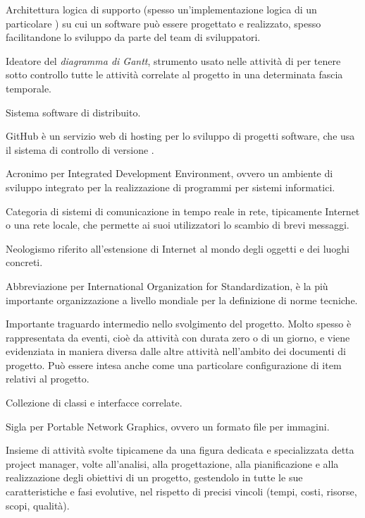 Architettura logica di supporto (spesso un'implementazione logica di un particolare ) su cui un software può essere progettato e realizzato, spesso facilitandone lo sviluppo da parte del team di sviluppatori.
\clearpage

Ideatore del \textit{diagramma di Gantt}, strumento usato nelle attività di  per tenere sotto controllo tutte le attività correlate al progetto in una determinata fascia temporale.

Sistema software di  distribuito.

GitHub è un servizio web di hosting per lo sviluppo di progetti software, che usa il sistema di controllo di versione .
\clearpage

Acronimo per Integrated Development Environment, ovvero un ambiente di sviluppo integrato per la realizzazione di programmi per sistemi informatici.

Categoria di sistemi di comunicazione in tempo reale in rete, tipicamente Internet o una rete locale, che permette ai suoi utilizzatori lo scambio di brevi messaggi.

Neologismo riferito all'estensione di Internet al mondo degli oggetti e dei luoghi concreti.

Abbreviazione per International Organization for Standardization, è la più importante organizzazione a livello mondiale per la definizione di norme tecniche.
\clearpage

Importante traguardo intermedio nello svolgimento del progetto. Molto spesso è rappresentata da eventi, cioè da attività con durata zero o di un giorno, e viene evidenziata in maniera diversa dalle altre attività nell'ambito dei documenti di progetto. Può essere intesa anche come una particolare configurazione di item relativi al progetto.

\clearpage

Collezione di classi e interfacce correlate.

Sigla per Portable Network Graphics, ovvero un formato file per immagini.

Insieme di attività svolte tipicamene da una figura dedicata e specializzata detta project manager, volte all'analisi, alla progettazione, alla pianificazione e alla realizzazione degli obiettivi di un progetto, gestendolo in tutte le sue caratteristiche e fasi evolutive, nel rispetto di precisi vincoli (tempi, costi, risorse, scopi, qualità).
\clearpage

